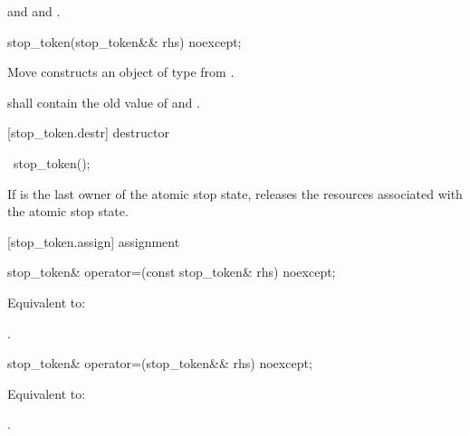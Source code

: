 {\begin{itemdescr}
  \pnum\postconditions {}
                and 
                and .
\end{itemdescr}

%
\begin{itemdecl}
stop_token(stop_token&& rhs) noexcept;
\end{itemdecl}
\begin{itemdescr}
  \pnum\effects Move constructs an object of type  from .

  \pnum\postconditions {} shall contain the old value of  and
                        .
\end{itemdescr}

[stop_token.destr]{ destructor}

%
\begin{itemdecl}
~stop_token();
\end{itemdecl}

\begin{itemdescr}
 \pnum\effects If  is the last owner of the atomic stop state,
                releases the resources associated with the atomic stop state.
\end{itemdescr}

[stop_token.assign]{ assignment}

%
\begin{itemdecl}
stop_token& operator=(const stop_token& rhs) noexcept;
\end{itemdecl}
\begin{itemdescr}
  \pnum\effects Equivalent to: 

  \pnum\returns {}.
\end{itemdescr}

%
\begin{itemdecl}
stop_token& operator=(stop_token&& rhs) noexcept;
\end{itemdecl}
\begin{itemdescr}
  \pnum\effects Equivalent to: 

  \pnum\returns {}.
\end{itemdescr}

}
